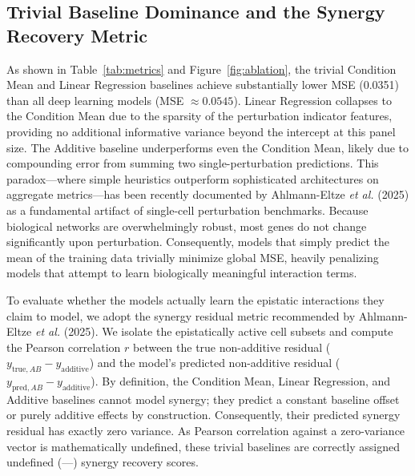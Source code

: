 \documentclass{bioinfo}
\begin{document}
\subsection{Trivial Baseline Dominance and the Synergy Recovery Metric}

As shown in Table~\ref{tab:metrics} and Figure~\ref{fig:ablation}, the trivial Condition Mean and Linear Regression baselines achieve substantially lower MSE (0.0351) than all deep learning models (MSE $\approx 0.0545$). Linear Regression collapses to the Condition Mean due to the sparsity of the perturbation indicator features, providing no additional informative variance beyond the intercept at this panel size. The Additive baseline underperforms even the Condition Mean, likely due to compounding error from summing two single-perturbation predictions. This paradox---where simple heuristics outperform sophisticated architectures on aggregate metrics---has been recently documented by Ahlmann-Eltze \textit{et al.} (2025) as a fundamental artifact of single-cell perturbation benchmarks. Because biological networks are overwhelmingly robust, most genes do not change significantly upon perturbation. Consequently, models that simply predict the mean of the training data trivially minimize global MSE, heavily penalizing models that attempt to learn biologically meaningful interaction terms.

To evaluate whether the models actually learn the epistatic interactions they claim to model, we adopt the synergy residual metric recommended by Ahlmann-Eltze \textit{et al.} (2025). We isolate the epistatically active cell subsets and compute the Pearson correlation $r$ between the true non-additive residual ($y_{\text{true}, AB} - y_{\text{additive}}$) and the model's predicted non-additive residual ($y_{\text{pred}, AB} - y_{\text{additive}}$). By definition, the Condition Mean, Linear Regression, and Additive baselines cannot model synergy; they predict a constant baseline offset or purely additive effects by construction. Consequently, their predicted synergy residual has exactly zero variance. As Pearson correlation against a zero-variance vector is mathematically undefined, these trivial baselines are correctly assigned undefined (---) synergy recovery scores.
\end{document}
